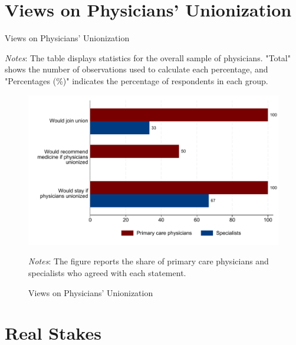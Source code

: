 \documentclass[11pt]{article}
\theoremstyle{definition}
\begin{document}
\clearpage

\section{Views on Physicians' Unionization} 

\begin{table}[H]
    \centering
    \caption{Views on Physicians' Unionization}
        \begin{adjustbox}{width=1\linewidth} 

\end{adjustbox}
     \parbox{\linewidth}{
        	\vspace{.2cm}
        		\scriptsize{\scriptsize{{\emph{Notes}: The table displays statistics for the overall sample of physicians. "Total" shows the number of observations used to calculate each percentage, and "Percentages (\%)" indicates the percentage of respondents in each group. }}}}
    \label{tab:ai_table}
\end{table}

\begin{figure}[H]
	\centering
	\caption{Views on Physicians' Unionization}
	\label{fig:cat_belief}
	\begin{adjustbox}{width=0.85\textwidth}
		\includegraphics{Pre-Survey/figures/sec_stage_byphystype.pdf}
	\end{adjustbox}
	\parbox{.9\linewidth}{
		\vspace{.2cm}
		\scriptsize{\emph{Notes}: The figure reports the share of primary care physicians and specialists who agreed with each statement.}
	}
\end{figure}


\clearpage

\section{Real Stakes}
\end{document}
